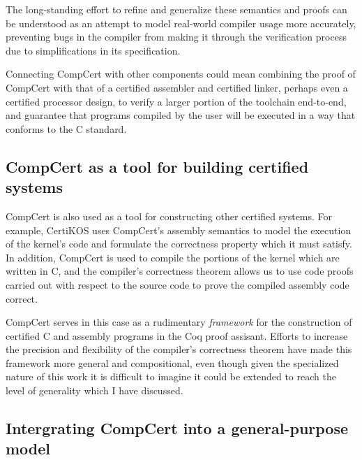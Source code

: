 \documentclass[11pt,oneside,draft]{book}
\theoremstyle{definition}
\begin{document}
The long-standing effort to refine and generalize
these semantics and proofs
can be understood as
an attempt to model real-world compiler usage
more accurately,
preventing bugs in the compiler
from making it through the verification process
due to simplifications in its specification.

Connecting CompCert with other components
could mean combining the proof of CompCert
with that of a certified assembler
and certified linker,
perhaps even a certified processor design,
to verify a larger portion of the toolchain end-to-end,
and guarantee that programs compiled by the user
will be executed in a way that conforms to
the C standard.

\subsection{CompCert as a tool for building certified systems}

CompCert is also used as a tool
for constructing other certified systems.
For example,
CertiKOS uses CompCert's assembly semantics
to model the execution of the kernel's code
and formulate the correctness property
which it must satisfy.
In addition,
CompCert is used to compile the portions of the kernel
which are written in C,
and the compiler's correctness theorem
allows us to use code proofs carried out
with respect to the source code
to prove the compiled assembly code correct.

CompCert serves in this case as
a rudimentary \emph{framework} for the construction of
certified C and assembly programs
in the Coq proof assisant.
Efforts to increase the precision and flexibility
of the compiler's correctness theorem
have made this framework more general and compositional,
even though given the specialized nature
of this work
it is difficult to imagine
it could be extended
to reach the level of generality which I have discussed.

\subsection{Intergrating CompCert into a general-purpose model}
\end{document}
